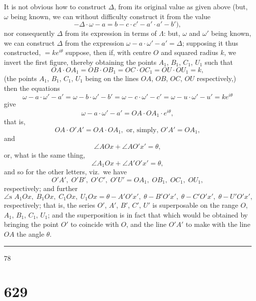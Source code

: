 \documentclass[12pt,a4paper]{article}
\begin{document}
\newpage

\noindent
It is not obvious how to construct $\Delta$, from its original value as given above (but, $\omega$ being known, we can without difficulty construct it from the value
\[
-\Delta \cdot \omega - a = b - c \cdot c' - a' \cdot a' - b'),
\]
nor consequently $\Delta$ from its expression in terms of $\Lambda$: but, $\omega$ and $\omega'$ being known, we can construct $\Delta$ from the expression $\omega - a \cdot \omega' - a' = \Delta$; supposing it thus constructed, $= ke^{i\theta}$ suppose, then if, with centre $O$ and squared radius $k$, we invert the first figure, thereby obtaining the points $A_1$, $B_1$, $C_1$, $U_1$ such that
\[
OA \cdot OA_1 = OB \cdot OB_1 = OC \cdot OC_1 = OU \cdot OU_1 = k,
\]
(the points $A_1$, $B_1$, $C_1$, $U_1$ being on the lines $OA$, $OB$, $OC$, $OU$ respectively,) then the equations
\[
\omega - a \cdot \omega' - a' = \omega - b \cdot \omega' - b' = \omega - c \cdot \omega' - c' = \omega - u \cdot \omega' - u' = ke^{i\theta}
\]
give
\[
\omega - a \cdot \omega' - a' = OA \cdot OA_1 \cdot e^{i\theta},
\]
that is,
\[
OA \cdot O'A' = OA \cdot OA_1, \text{ or, simply, } O'A' = OA_1,
\]
and
\[
\angle AOx + \angle AO'x' = \theta,
\]
or, what is the same thing,
\[
\angle A_1Ox + \angle A'O'x' = \theta,
\]
and so for the other letters, viz.\ we have
\[
O'A',\; O'B',\; O'C',\; O'U' = OA_1,\; OB_1,\; OC_1,\; OU_1,
\]
respectively; and further
\[
\angle\text{s } A_1Ox,\; B_1Ox,\; C_1Ox,\; U_1Ox = \theta - A'O'x',\; \theta - B'O'x',\; \theta - C'O'x',\; \theta - U'O'x',
\]
respectively; that is, the series $O'$, $A'$, $B'$, $C'$, $U'$ is superposable on the range $O$, $A_1$, $B_1$, $C_1$, $U_1$; and the superposition is in fact that which would be obtained by bringing the point $O'$ to coincide with $O$, and the line $O'A'$ to make with the line $OA$ the angle $\theta$.

\noindent\rule{2em}{0.4pt}\hfill 78

\newpage

\section*{629}
\end{document}
